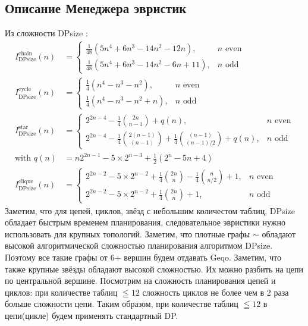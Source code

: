 \documentclass[12pt]{article}
\begin{document}
\begin{flushleft}
\section*{Описание Менеджера эвристик}
Из сложности DPsize \cite{Moerkotte}:
\begin{align*}
    I^{\text{chain}}_{\text{DPsize}}(n) &=
    \begin{cases}
        \frac{1}{48} (5n^4 + 6n^3 - 14n^2 - 12n), & n \text{ even} \\
        \frac{1}{48} (5n^4 + 6n^3 - 14n^2 - 6n + 11), & n \text{ odd}
    \end{cases}
    \\
    I^{\text{cycle}}_{\text{DPsize}}(n) &=
    \begin{cases}
        \frac{1}{4} (n^4 - n^3 - n^2), & n \text{ even} \\
        \frac{1}{4} (n^4 - n^3 - n^2 + n), & n \text{ odd}
    \end{cases}
    \\
    I^{\text{star}}_{\text{DPsize}}(n) &=
    \begin{cases}
        2^{2n-4} - \frac{1}{4} \binom{2n}{n-1} + q(n), & n \text{ even} \\
        2^{2n-4} - \frac{1}{4} \binom{2(n-1)}{(n-1)} + \frac{1}{4} \binom{(n-1)}{(n-1)/2} + q(n), & n \text{ odd}
    \end{cases}
    \\
    \text{with } q(n) &= n 2^{2n-1} - 5 \times 2^{n-3} + \frac{1}{2} (2^n - 5n + 4)
    \\
    I^{\text{clique}}_{\text{DPsize}}(n) &=
    \begin{cases}
        2^{2n-2} - 5 \times 2^{n-2} + \frac{1}{4} \binom{2n}{n} - \frac{1}{4} \binom{n}{n/2} + 1, & n \text{ even} \\
        2^{2n-2} - 5 \times 2^{n-2} + \frac{1}{4} \binom{2n}{n} + 1, & n \text{ odd}
    \end{cases}
\end{align*}
Заметим, что для цепей, циклов, звёзд с небольшим количестом таблиц, DPsize обладает быстрым временем планирования, следовательное эвристики нужно использовать для крупных топологий.
Заметим, что плотные графы $\sim$  обладают высокой алгоритмической сложностью планирования
алгоритмом DPsize. Поэтому все такие графы от 6+ вершин будем отдавать Geqo. 
Заметим, что также крупные звёзды обладают высокой сложностью. Их можно разбить на цепи по центральной вершине.
Посмотрим на сложность планирования цепей и циклов: при количестве таблиц $\leqq 12$ сложность циклов не более чем в 2 раза 
больше сложности цепи. Таким образом, при количестве таблиц $\leqq 12$ в цепи(цикле) будем применять стандартный DP.


\end{flushleft}
\end{document}
